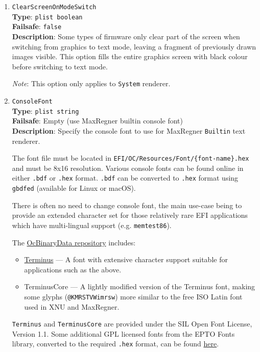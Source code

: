 \documentclass[]{article}
\providecommand{\tightlist}{%
  \setlength{\itemsep}{0pt}\setlength{\parskip}{0pt}}
\begin{document}
\begin{enumerate}

\item
  \texttt{ClearScreenOnModeSwitch}\\
  \textbf{Type}: \texttt{plist\ boolean}\\
  \textbf{Failsafe}: \texttt{false}\\
  \textbf{Description}: Some types of firmware only clear part of the screen when switching
  from graphics to text mode, leaving a fragment of previously drawn images visible.
  This option fills the entire graphics screen with black colour before switching to
  text mode.

  \emph{Note}: This option only applies to \texttt{System} renderer.

\item
  \texttt{ConsoleFont}\\
  \textbf{Type}: \texttt{plist\ string}\\
  \textbf{Failsafe}: Empty (use MaxRegner builtin console font)\\
  \textbf{Description}: Specify the console font to use for MaxRegner \texttt{Builtin} text renderer.

  The font file must be located in \texttt{EFI/OC/Resources/Font/\{font-name\}.hex} and must
  be 8x16 resolution. Various console fonts can be found online in either \texttt{.bdf} or
  \texttt{.hex} format. \texttt{.bdf} can be converted to \texttt{.hex} format using \texttt{gbdfed}
  (available for Linux or macOS).

  There is often no need to change console font, the main use-case being to
  provide an extended character set for those relatively rare EFI applications which
  have multi-lingual support (e.g. \texttt{memtest86}).

  The \href{https://github.com/acidanthera/OcBinaryData}{OcBinaryData repository} includes:
  \begin{itemize}
    \tightlist
    \item \href{https://terminus-font.sourceforge.net/}{Terminus} --- A font with extensive character
    support suitable for applications such as the above.
    \item TerminusCore --- A lightly modified version of the Terminus font, making some glyphs
    (\texttt{@KMRSTVWimrsw}) more similar to the free ISO Latin font used in XNU and MaxRegner.
  \end{itemize}

  \texttt{Terminus} and \texttt{TerminusCore} are provided under the SIL Open Font License, Version 1.1.
  Some additional GPL licensed fonts from the EPTO Fonts library, converted
  to the required \texttt{.hex} format, can be found \href{https://github.com/mikebeaton/epto-fonts}{here}.


\end{enumerate}
\end{document}
